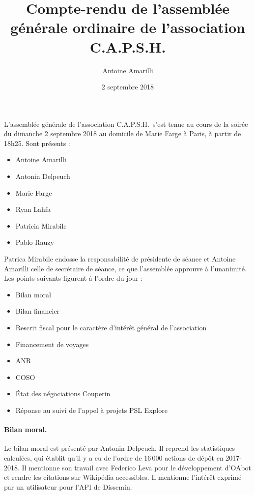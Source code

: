 \documentclass{scrartcl}
\title{Compte-rendu de l'assemblée générale ordinaire de l'association C.A.P.S.H.}
\author{Antoine Amarilli}
\date{2 septembre 2018}
\begin{document}
\maketitle

L'assemblée générale de l'association C.A.P.S.H.\ s'est tenue au cours de la
soirée du dimanche 2 septembre 2018 au domicile de Marie Farge à Paris, à partir
de 18h25.
% 
Sont présents :

\medskip

\begin{itemize}
\item Antoine Amarilli
\item Antonin Delpeuch
\item Marie Farge
\item Ryan Lahfa
\item Patricia Mirabile
\item Pablo Rauzy
\end{itemize}

\medskip

Patrica Mirabile endosse la responsabilité de présidente de séance et Antoine
Amarilli celle de secrétaire de séance, ce que l'assemblée approuve à l'unanimité.
Les points suivants figurent à l'ordre
du jour :

\medskip

\begin{itemize}
\item Bilan moral
\item Bilan financier
\item Rescrit fiscal pour le caractère d'intérêt général de l'association
\item Financement de voyages
\item ANR
\item COSO
\item État des négociations Couperin
\item Réponse au suivi de l'appel à projets PSL Explore
\end{itemize}

\paragraph{Bilan moral.} 
Le bilan moral est présenté par Antonin Delpeuch.
Il reprend les statistiques calculées, qui établit qu'il y a eu de l'ordre de
16\,000 actions de dépôt en 2017-2018.
Il mentionne son travail avec Federico Leva pour le développement d'OAbot et
rendre les citations sur Wikipédia accessibles. Il mentionne l'intérêt exprimé
par un utilisateur pour l'API de Dissemin.
\end{document}
